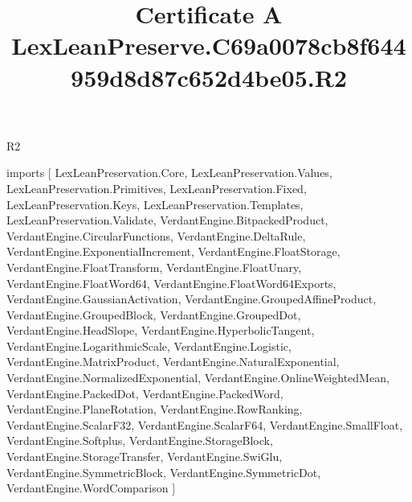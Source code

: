 \begin{lexlean}{R2}
\title{Certificate A LexLeanPreserve.C69a0078cb8f644959d8d87c652d4be05.R2}
\begin{coremodule}
imports [
  LexLeanPreservation.Core,
  LexLeanPreservation.Values,
  LexLeanPreservation.Primitives,
  LexLeanPreservation.Fixed,
  LexLeanPreservation.Keys,
  LexLeanPreservation.Templates,
  LexLeanPreservation.Validate,
  VerdantEngine.BitpackedProduct,
  VerdantEngine.CircularFunctions,
  VerdantEngine.DeltaRule,
  VerdantEngine.ExponentialIncrement,
  VerdantEngine.FloatStorage,
  VerdantEngine.FloatTransform,
  VerdantEngine.FloatUnary,
  VerdantEngine.FloatWord64,
  VerdantEngine.FloatWord64Exports,
  VerdantEngine.GaussianActivation,
  VerdantEngine.GroupedAffineProduct,
  VerdantEngine.GroupedBlock,
  VerdantEngine.GroupedDot,
  VerdantEngine.HeadSlope,
  VerdantEngine.HyperbolicTangent,
  VerdantEngine.LogarithmicScale,
  VerdantEngine.Logistic,
  VerdantEngine.MatrixProduct,
  VerdantEngine.NaturalExponential,
  VerdantEngine.NormalizedExponential,
  VerdantEngine.OnlineWeightedMean,
  VerdantEngine.PackedDot,
  VerdantEngine.PackedWord,
  VerdantEngine.PlaneRotation,
  VerdantEngine.RowRanking,
  VerdantEngine.ScalarF32,
  VerdantEngine.ScalarF64,
  VerdantEngine.SmallFloat,
  VerdantEngine.Softplus,
  VerdantEngine.StorageBlock,
  VerdantEngine.StorageTransfer,
  VerdantEngine.SwiGlu,
  VerdantEngine.SymmetricBlock,
  VerdantEngine.SymmetricDot,
  VerdantEngine.WordComparison
]


\end{coremodule}
\end{lexlean}
